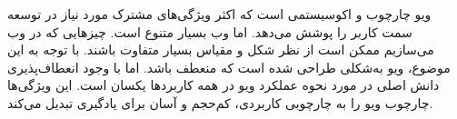 ویو چارچوب و اکوسیستمی است که اکثر ویژگی‌های مشترک مورد نیاز در توسعه سمت کاربر را پوشش می‌دهد. اما وب بسیار متنوع است. چیزهایی که در وب می‌سازیم ممکن است از نظر شکل و مقیاس بسیار متفاوت باشند. با توجه به این موضوع، ویو به‌شکلی طراحی شده است که منعطف باشد. اما با وجود انعطاف‌پذیری دانش اصلی در مورد نحوه عملکرد ویو در همه کاربردها یکسان است\cite{vue}. این ویژگی‌ها چارچوب ویو را به چارچوبی کاربردی، کم‌حجم و آسان برای یادگیری تبدیل می‌کند.